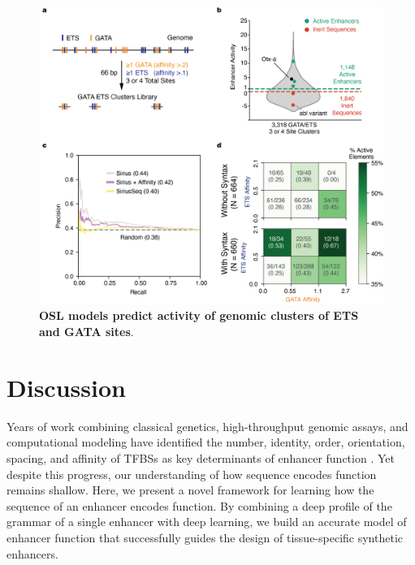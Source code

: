 \begin{figure}[p]
    \centering
    \includegraphics[height=0.7\textheight, keepaspectratio]{2_figures-and-files/Fig5.png}
    \caption[OSL models predict activity of genomic clusters of ETS and GATA sites.]{\textbf{OSL models predict activity of genomic clusters of ETS and GATA sites}.}
    \label{fig:2 Figure 5}
\end{figure}

\clearpage

\section{Discussion}

Years of work combining classical genetics, high-throughput genomic assays, and computational modeling have identified the number, identity, order, orientation, spacing, and affinity of TFBSs as key determinants of enhancer function \cite{Jindal2021-zk}. Yet despite this progress, our understanding of how sequence encodes function remains shallow. Here, we present a novel framework for learning how the sequence of an enhancer encodes function. By combining a deep profile of the grammar of a single enhancer with deep learning, we build an accurate model of enhancer function that successfully guides the design of tissue-specific synthetic enhancers.

